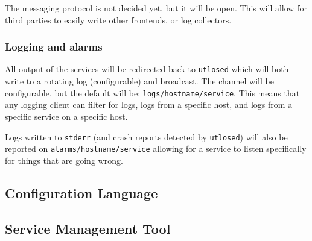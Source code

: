 \documentclass{article}
\newcommand*{\bibtitle}{Bibliography}
\begin{document}
The messaging protocol is not decided yet, but it will be open. This will allow for third parties to easily
write other frontends, or log collectors.

\subsubsection{Logging and alarms}
All output of the services will be redirected back to \texttt{utlosed} which will both write to a rotating log
(configurable) and broadcast. The channel will be configurable, but the default will be: \texttt{logs/hostname/service}.
This means that any logging client can filter for logs, logs from a specific host, and logs from a specific service on a specific
host.

Logs written to \texttt{stderr} (and crash reports detected by \texttt{utlosed}) will also be reported on \texttt{alarms/hostname/service}
allowing for a service to listen specifically for things that are going wrong.

\subsection{Configuration Language}
\subsection{Service Management Tool}

\setlength{\baselineskip}{0pt} %

{\renewcommand*\MakeUppercase[1]{#1}%
\printbibliography[heading=bibintoc,title={\bibtitle}]}
\end{document}
